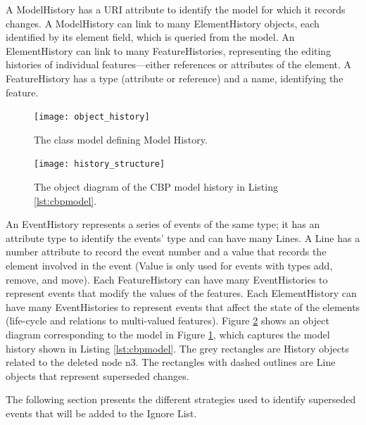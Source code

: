 A \textsf{ModelHistory} has a \textsf{URI} attribute to identify the model for which it records changes. A \textsf{ModelHistory} can link to many \textsf{ElementHistory} objects, each identified by its \textsf{element} field, which is queried from the model. An \textsf{ElementHistory} can link to many \textsf{FeatureHistories}, representing the editing histories of individual features—either references or attributes of the element. A \textsf{FeatureHistory} has a \textsf{type} (attribute or reference) and a \textsf{name}, identifying the feature.

\begin{figure}[ht]
  \centering
  \texttt{[image: object\_history]}
  \caption{The class model defining Model History.}
  \label{fig:object_history}
\end{figure}

\begin{figure}[ht]
  \centering
  \texttt{[image: history\_structure]}
  \caption{The object diagram of the CBP model history in Listing \ref{lst:cbpmodel}.}
  \label{fig:history_structure}
\end{figure}

An \textsf{EventHistory} represents a series of events of the same type; it has an attribute \textsf{type} to identify the events’ type and can have many \textsf{Line}s. A \textsf{Line} has a \textsf{number} attribute to record the event number and a \textsf{value} that records the element involved in the event (Value is only used for events with types \textsf{add}, \textsf{remove}, and \textsf{move}). Each \textsf{FeatureHistory} can have many \textsf{EventHistories} to represent events that modify the values of the features. Each \textsf{ElementHistory} can have many \textsf{EventHistories} to represent events that affect the state of the elements (life-cycle and relations to multi-valued features). Figure \ref{fig:history_structure} shows an object diagram corresponding to the model in Figure \ref{fig:object_history}, which captures the model history shown in Listing \ref{lst:cbpmodel}. The grey rectangles are \textsf{History} objects related to the deleted node \textsf{n3}. The rectangles with dashed outlines are \textsf{Line} objects that represent superseded changes.

The following section presents the different strategies used to identify superseded events that will be added to the Ignore List.

